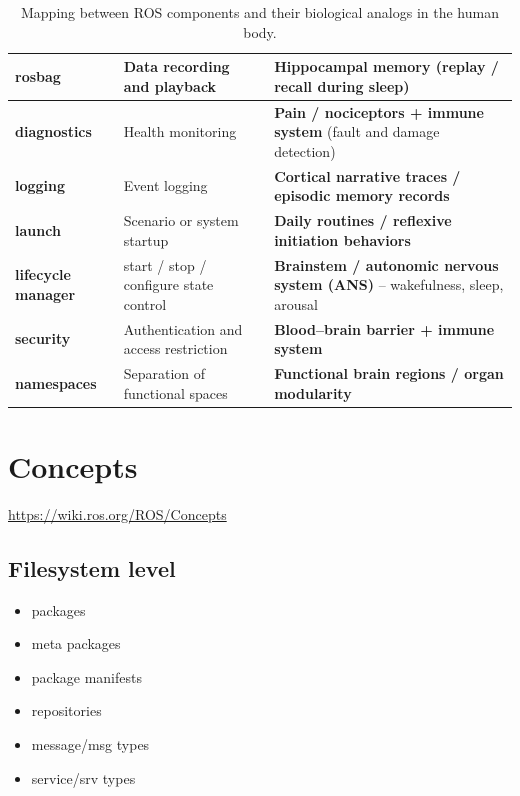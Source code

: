 \begin{table}[h!]
{\begin{tabular}{|>{\raggedright\arraybackslash}p{3cm}|>{\raggedright\arraybackslash}p{4cm}|>{\raggedright\arraybackslash}p{8.5cm}|}
                \hline
                \textbf{rosbag}                     & Data recording and playback            & \textbf{Hippocampal memory} (replay / recall during sleep)                                                          \\
                \hline
                \textbf{diagnostics}                & Health monitoring                      & \textbf{Pain / nociceptors + immune system} (fault and damage detection)                                            \\
                \hline
                \textbf{logging}                    & Event logging                          & \textbf{Cortical narrative traces / episodic memory records}                                                        \\
                \hline
                \textbf{launch}                     & Scenario or system startup             & \textbf{Daily routines / reflexive initiation behaviors}                                                            \\
                \hline
                \textbf{lifecycle manager}          & start / stop / configure state control & \textbf{Brainstem / autonomic nervous system (ANS)} – wakefulness, sleep, arousal                                   \\
                \hline
                \textbf{security}                   & Authentication and access restriction  & \textbf{Blood–brain barrier + immune system}                                                                        \\
                \hline
                \textbf{namespaces}                 & Separation of functional spaces        & \textbf{Functional brain regions / organ modularity}                                                                \\
                \hline
            \end{tabular}
        }
        \caption{Mapping between ROS components and their biological analogs in the human body.}
        \label{tab:ros_human_mapping}
    \end{table}
\section{Concepts}
\url{https://wiki.ros.org/ROS/Concepts}
    \subsection{Filesystem level}
        \begin{itemize}
            \item packages
            \item meta packages
            \item package manifests
            \item repositories
            \item message/msg types
            \item service/srv types
        \end{itemize}
